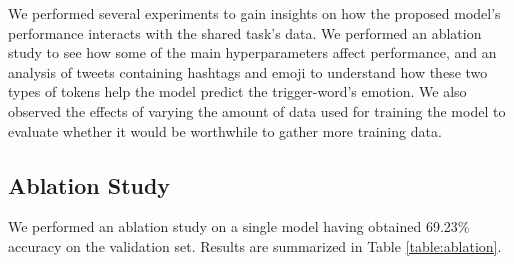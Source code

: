 \documentclass[11pt,a4paper]{article}
\begin{document}
We performed several experiments to gain insights on how the proposed model's performance interacts with the shared task's data. We performed an ablation study to see how some of the main hyperparameters affect performance, and an analysis of tweets containing hashtags and emoji to understand how these two types of tokens help the model predict the trigger-word's emotion. We also observed the effects of varying the amount of data used for training the model to evaluate whether it would be worthwhile to gather more training data.

\subsection{Ablation Study}%
\label{sub:ablation_study}

We performed an ablation study on a single model having obtained 69.23\% accuracy on the validation set. Results are summarized in Table \ref{table:ablation}.
\end{document}
